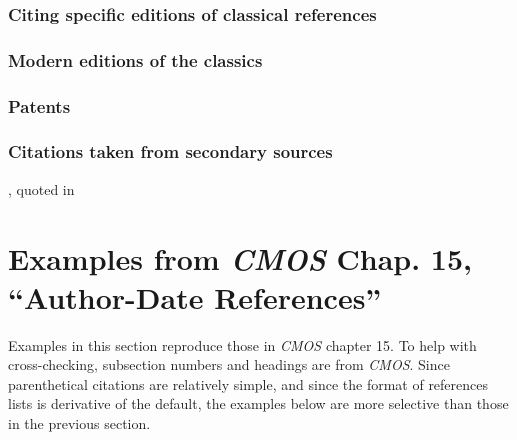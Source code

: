 \documentclass[11pt,letterpaper,oneside]{article}
\begin{document}
\setcounter{subsubsection}{245}
\subsubsection{Citing specific editions of classical references}

\begin{citebib}
\item \cite{epictetus1916}
\end{citebib}

\setcounter{subsubsection}{250}
\subsubsection{Modern editions of the classics}

\begin{citebib}
\item \cite{aristotle1983}
\item \cite{maimonides1965}
\end{citebib}

\setcounter{subsubsection}{257}
\subsubsection{Patents}

\begin{citebib}
\item \cite{iizuka1986}
\end{citebib}

\setcounter{subsubsection}{259}
\subsubsection{Citations taken from secondary sources}

\begin{citebib}
\item \cite[269]{zukofsky1931}, quoted in \cite[78]{costello1981}
\end{citebib}

\section{Examples from \emph{CMOS} Chap. 15, ``Author-Date
References''}
\label{paren}

Examples in this section reproduce those in \textit{CMOS} chapter 15.
To help with cross-checking, subsection numbers and headings are from
\textit{CMOS}. Since parenthetical citations are relatively simple,
and since the format of references lists is derivative of the default,
the examples below are more selective than those in the previous
section.
\end{document}
